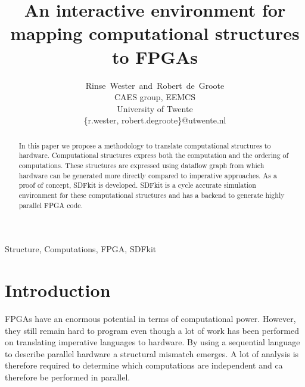 \documentclass[journal]{IEEEtran}
\begin{document}
%
\title{An interactive environment for mapping computational structures to FPGAs}
%
%
%

\author{Rinse~Wester~and~Robert~de~Groote \\CAES group, EEMCS\\ University of Twente\\ \{r.wester, robert.degroote\}@utwente.nl}

\maketitle


\begin{abstract}
  In this paper we propose a methodology to translate computational structures to hardware.
  Computational structures express both the computation and the ordering of computations.
  These structures are expressed using dataflow graph from which hardware can be generated more directly compared to imperative approaches.
  As a proof of concept, SDFkit is developed.
  SDFkit is a cycle accurate simulation environment for these computational structures and has a backend to generate highly parallel FPGA code.
\end{abstract}

\begin{IEEEkeywords}
  Structure, Computations, FPGA, SDFkit
\end{IEEEkeywords}


\IEEEpeerreviewmaketitle

\section{Introduction}
  
  FPGAs have an enormous potential in terms of computational power.
  However, they still remain hard to program even though a lot of work has been performed on translating imperative languages to hardware.
  By using a sequential language to describe parallel hardware a structural mismatch emerges.
  A lot of analysis is therefore required to determine which computations are independent and ca therefore be performed in parallel.
\end{document}
